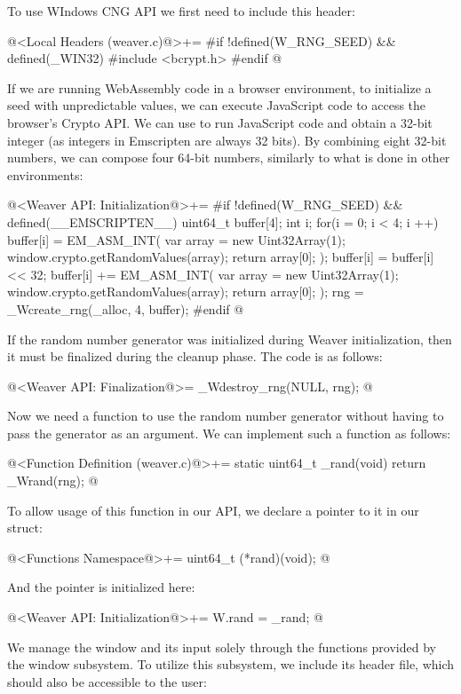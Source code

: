 To use WIndows CNG API we first need to include this header:

\iniciocodigo
@<Local Headers (weaver.c)@>+=
#if !defined(W_RNG_SEED) && defined(_WIN32)
#include <bcrypt.h>
#endif
@
\fimcodigo

If we are running WebAssembly code in a browser environment, to
initialize a seed with unpredictable values, we can execute JavaScript
code to access the browser's Crypto API. We can
use  to run JavaScript code and obtain a 32-bit
integer (as integers in Emscripten are always 32 bits). By combining
eight 32-bit numbers, we can compose four 64-bit numbers, similarly to
what is done in other environments:

\iniciocodigo
@<Weaver API: Initialization@>+=
#if !defined(W_RNG_SEED) && defined(__EMSCRIPTEN__)
{
  uint64_t buffer[4];
  int i;
  for(i = 0; i < 4; i ++){
    buffer[i] = EM_ASM_INT({
      var array = new Uint32Array(1);
      window.crypto.getRandomValues(array);
      return array[0];
    });
    buffer[i] = buffer[i] << 32;
    buffer[i] += EM_ASM_INT({
      var array = new Uint32Array(1);
      window.crypto.getRandomValues(array);
      return array[0];
    });
  }
  rng = _Wcreate_rng(_alloc, 4, buffer);
}
#endif
@
\fimcodigo

If the random number generator was initialized during Weaver
initialization, then it must be finalized during the cleanup
phase. The code is as follows:

\iniciocodigo
@<Weaver API: Finalization@>=
_Wdestroy_rng(NULL, rng);
@
\fimcodigo

Now we need a function to use the random number generator without
having to pass the generator as an argument. We can implement such a
function as follows:

\iniciocodigo
@<Function Definition (weaver.c)@>+=
static uint64_t _rand(void){
  return _Wrand(rng);
}
@
\fimcodigo

To allow usage of this function in our API, we declare a pointer to it
in our  struct:

\iniciocodigo
@<Functions Namespace@>+=
uint64_t (*rand)(void);
@
\fimcodigo

And the pointer is initialized here:

\iniciocodigo
@<Weaver API: Initialization@>+=
W.rand = _rand;
@
\fimcodigo


We manage the window and its input solely through the functions
provided by the window subsystem. To utilize this subsystem, we
include its header file, which should also be accessible to the
user:

